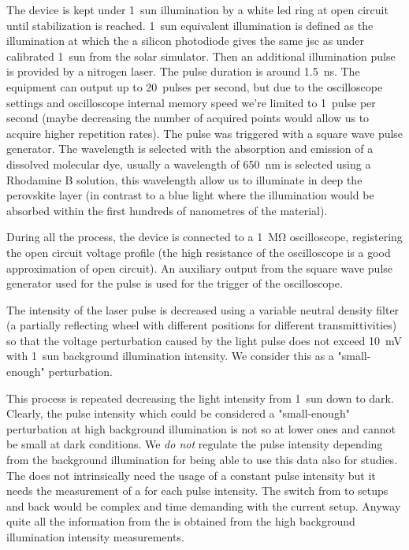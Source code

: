 	The device is kept under 1~sun illumination by a white \gls{led} ring at open circuit until stabilization is reached. 1~sun equivalent illumination is defined as the illumination at which the a silicon photodiode gives the same \gls{jsc} as under calibrated 1~sun from the solar simulator. Then an additional illumination pulse is provided by a nitrogen laser. The pulse duration is around \SI{1.5}{\ns}. The equipment can output up to 20~pulses per second, but due to the oscilloscope settings and oscilloscope internal memory speed we're limited to 1~pulse per second (maybe decreasing the number of acquired points would allow us to acquire higher repetition rates). The pulse was triggered with a square wave pulse generator. The wavelength is selected with the absorption and emission of a dissolved molecular dye, usually a wavelength of \SI{650}{\nm} is selected using a Rhodamine B solution\cite{RadiantDyesLaser}, this wavelength allow us to illuminate in deep the perovskite layer (in contrast to a blue light where the illumination would be absorbed within the first hundreds of nanometres of the material).

	During all the process, the device is connected to a \SI{1}{\Mohm} oscilloscope, registering the open circuit voltage profile (the high resistance of the oscilloscope is a good approximation of open circuit). An auxiliary output from the square wave pulse generator used for the pulse is used for the trigger of the oscilloscope.

	The intensity of the laser pulse is decreased using a variable neutral density filter (a partially reflecting wheel with different positions for different transmittivities) so that the voltage perturbation caused by the light pulse does not exceed \SI{10}{\mV} with 1~sun background illumination intensity. We consider this as a "small-enough" perturbation.

	This process is repeated decreasing the light intensity from 1~sun down to dark. Clearly, the pulse intensity which could be considered a "small-enough" perturbation at high background illumination is not so at lower ones and cannot be small at dark conditions. We \emph{do not} regulate the pulse intensity depending from the background illumination for being able to use this data also for  studies. The  does not intrinsically need the usage of a constant pulse intensity but it needs the measurement of a  for each pulse intensity. The switch from  to  setups and back would be complex and time demanding with the current setup. Anyway quite all the information from the  is obtained from the high background illumination intensity measurements.

